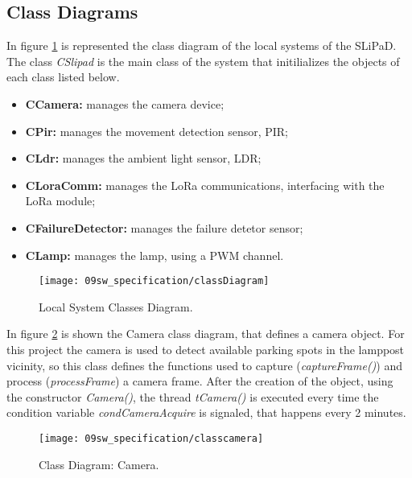 \subsection{Class Diagrams}
In figure \ref{fig:classDiag} is represented the class diagram of the local systems of the SLiPaD. The class \textit{CSlipad} is the main class of the system that initilializes the objects of each class listed below.

\begin{itemize}
	\item \textbf{CCamera:} manages the camera device;
	
	\item \textbf{CPir:} manages the movement detection sensor, PIR;
	
	\item \textbf{CLdr:} manages the ambient light sensor, LDR;
	
	\item \textbf{CLoraComm:} manages the LoRa communications, interfacing with the LoRa module;
	
	\item \textbf{CFailureDetector:} manages the failure detetor sensor;
	
	\item \textbf{CLamp:} manages the lamp, using a PWM channel.	
\end{itemize}

\begin{figure}[H]
	\centering
	\texttt{[image: 09sw\_specification/classDiagram]}
	\caption{Local System Classes Diagram.}
	\label{fig:classDiag}
\end{figure}


In figure \ref{fig:classcamera} is shown the Camera class diagram, that defines a camera object.  For this project the camera is used to detect available parking spots in the lamppost vicinity, so this class defines the functions used to capture (\textit{captureFrame()}) and process (\textit{processFrame}) a camera frame. After the creation of the object, using the constructor \textit{Camera()}, the thread \textit{tCamera()} is executed every time the condition variable \textit{condCameraAcquire} is signaled, that happens every 2 minutes.


\begin{figure}[H]
	\centering
	\texttt{[image: 09sw\_specification/classcamera]}
	\caption{Class Diagram: Camera.}
	\label{fig:classcamera}
\end{figure}

